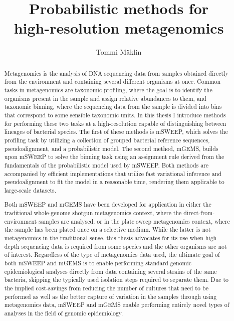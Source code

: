 \documentclass[officiallayout]{tktla}
\title{Probabilistic methods for \\ high-resolution metagenomics}
\author{Tommi M\"aklin}
\begin{document}
\frontmatter

\maketitle

\begin{abstract}
  Metagenomics is the analysis of DNA sequencing data from samples
  obtained directly from the environment and containing several
  different organisms at once. Common tasks in metagenomics are
  taxonomic profiling, where the goal is to identify the organisms
  present in the sample and assign relative abundances to them, and
  taxonomic binning, where the sequencing data from the sample is
  divided into bins that correspond to some sensible taxonomic
  units. In this thesis I introduce methods for performing these two
  tasks at a high-resolution capable of distinguishing between
  lineages of bacterial species. The first of these methods is mSWEEP,
  which solves the profiling task by utilizing a collection of grouped
  bacterial reference sequences, pseudoalignment, and a probabilistic
  model. The second method, mGEMS, builds upon mSWEEP to solve the
  binning task using an assignment rule derived from the fundamentals
  of the probabilistic model used by mSWEEP. Both methods are
  accompanied by efficient implementations that utilize fast
  variational inference and pseudoalignment to fit the model in a
  reasonable time, rendering them applicable to large-scale
  datasets.

  Both mSWEEP and mGEMS have been developed for application in either
  the traditional whole-genome shotgun metagenomics context, where the
  direct-from-environment samples are analysed, or in the plate sweep
  metagenomics context, where the sample has been plated once on a
  selective medium. While the latter is not metagenomics in the
  traditional sense, this thesis advocates for its use when high depth
  sequencing data is required from some species and the other
  organisms are not of interest. Regardless of the type of
  metagenomics data used, the ultimate goal of both mSWEEP and mGEMS
  is to enable performing standard genomic epidemiological analyses
  directly from data containing several strains of the same bacteria,
  skipping the typically used isolation steps required to separate
  them. Due to the implied cost-savings from reducing the number of
  cultures that need to be performed as well as the better capture of
  variation in the samples through using metagenomics data, mSWEEP and
  mGEMS enable performing entirely novel types of analyses in the
  field of genomic epidemiology.

\end{abstract}
\end{document}
